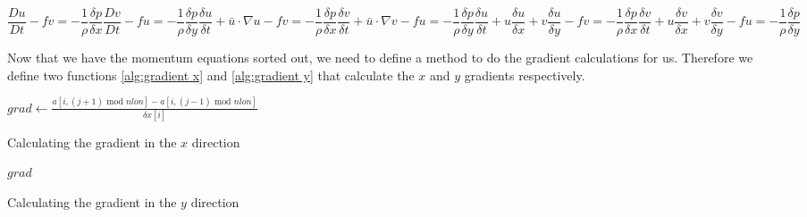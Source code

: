 \begin{subequations}
    \begin{equation}
        \frac{Du}{Dt} - fv = -\frac{1}{\rho} \frac{\delta p}{\delta x}
        \label{eq:x momentum}
    \end{equation}
    \begin{equation}
        \frac{Dv}{Dt} - fu = -\frac{1}{\rho} \frac{\delta p}{\delta y}
        \label{eq:y momentum}
    \end{equation}
    \begin{equation}
        \frac{\delta u}{\delta t} + \bar{u} \cdot \nabla u - fv = -\frac{1}{\rho}\frac{\delta p}{\delta x}
        \label{eq:x momentum laplace}
    \end{equation}
    \begin{equation}
        \frac{\delta v}{\delta t} + \bar{u} \cdot \nabla v - fu = -\frac{1}{\rho}\frac{\delta p}{\delta y}
        \label{eq:y momentum laplace}
    \end{equation}
    \begin{equation}
        \frac{\delta u}{\delta t} + u\frac{\delta u}{\delta x} + v\frac{\delta u}{\delta y} - fv = -\frac{1}{\rho}\frac{\delta p}{\delta x}
        \label{eq:x momentum final}
    \end{equation}
    \begin{equation}
        \frac{\delta v}{\delta t} + u\frac{\delta v}{\delta x} + v\frac{\delta v}{\delta y} - fu = -\frac{1}{\rho}\frac{\delta p}{\delta y}
        \label{eq:y momentum final}
    \end{equation}
\end{subequations}

Now that we have the momentum equations sorted out, we need to define a method to do the gradient calculations for us. Therefore we define two functions \autoref{alg:gradient x} and 
\autoref{alg:gradient y} that calculate the $x$ and $y$ gradients respectively.

\begin{algorithm}[hbt]
    $grad \leftarrow \frac{a[i, (j + 1)\text{ mod } nlon] - a[i, (j - 1) \text{ mod } nlon]}{\delta x[i]}$ \;
     \;
    \caption{Calculating the gradient in the $x$ direction}
    \label{alg:gradient x}
\end{algorithm}

\begin{algorithm}[hbt]
    \Return $grad$ \;
    \caption{Calculating the gradient in the $y$ direction}
    \label{alg:gradient y}
\end{algorithm}

